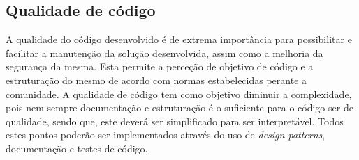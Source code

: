 \subsection{Qualidade de código}
A qualidade do código desenvolvido é de extrema importância para possibilitar e facilitar a manutenção da solução desenvolvida, assim como a melhoria da segurança da mesma. Esta permite a perceção de objetivo de código e a estruturação do mesmo de acordo com normas estabelecidas perante a comunidade. A qualidade de código tem como objetivo diminuir a complexidade, pois nem sempre documentação e estruturação é o suficiente para o código ser de qualidade, sendo que, este deverá ser simplificado para ser interpretável. Todos estes pontos poderão ser implementados através do uso de \textit{design patterns}, documentação e testes de código.





